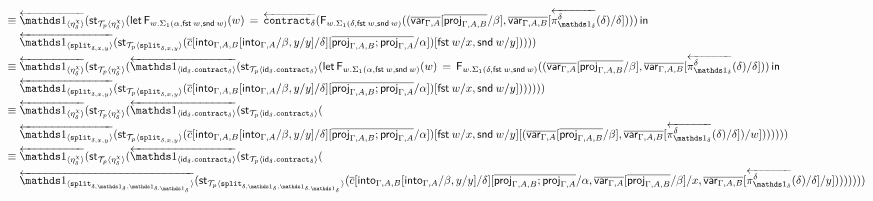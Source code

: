 \documentclass[10pt]{article}
\theoremstyle{definition}
\newcommand\dsd[1]{\ensuremath{\mathsf{#1}}}
\newcommand{\app}[2]{\ensuremath{#1 \: #2}}
\newcommand{\fst}[1]{\app{\dsd{fst}}{#1}}
\newcommand{\snd}[1]{\app{\dsd{snd}}{#1}}
\newcommand{\id}{\mathsf{id}}
\newcommand{\rewrite}[2]{\overleftarrow{#1}(#2)}
\newcommand\StI[2]{\ensuremath{\mathsf{st}_{#1}(#2)}}
\newcommand\FEs[4]{\ensuremath{\mathsf{let} \, \mathsf{F}_{#1}(#3) \, = \, {#2} \, \mathsf{in} \, #4}}
\newcommand\FIs[2]{\ensuremath{\mathsf{F}_{#1}{(#2)}}}
\newcommand\ApEl[2]{\mathcal{T}_{#1}\langle#2\rangle}
\newcommand\bdot[0]{\mathbin{.}}
\begin{document}
\begin{enumerate}[style = multiline, labelwidth = 80pt]
\begin{align*}
\equiv{} &\rewrite{\One_{\langle \eta^\chi_\delta \rangle}}{\StI{\ApEl{p}{\eta^\chi_\delta}}{\FEs{w. \Sigma_1(\alpha,\fst w, \snd w)}{\rewrite{\contract{\delta}}{\FIs{w. \Sigma_1(\delta,\fst w, \snd w)}{(\upstairs{\qvar{\Gamma, A}}[\upstairs{\proj{\Gamma, A, B}}/\beta], \upstairs{\qvar{\Gamma, A, B}}[\rewrite{\pi^\delta_{\One_\delta}}{\delta}/\delta])}}}{w}{\\&\rewrite{\ApOne{\tsplit{\delta,x,y}}}{\StI{\ApEl{p}{\tsplit{\delta,x,y}}}{\upstairs{c}[\into{\Gamma, A, B}[\into{\Gamma, A}/\beta, y/y] /\delta][\upstairs{\proj{\Gamma, A, B};\proj{\Gamma, A}}/\alpha]}[\fst w/x, \snd w/y]}})}} \\
\equiv{} &\rewrite{\One_{\langle \eta^\chi_\delta \rangle}}{\StI{\ApEl{p}{\eta^\chi_\delta}}{\rewrite{\One_{\langle \id_\delta \bdot \contract{\delta} \rangle}}{\StI{\ApEl{p}{\id_\delta \bdot \contract{\delta}}}{\FEs{w. \Sigma_1(\alpha,\fst w, \snd w)}{\FIs{w. \Sigma_1(\delta,\fst w, \snd w)}{(\upstairs{\qvar{\Gamma, A}}[\upstairs{\proj{\Gamma, A, B}}/\beta], \upstairs{\qvar{\Gamma, A, B}}[\rewrite{\pi^\delta_{\One_\delta}}{\delta}/\delta])}}{w}{\\&\rewrite{\ApOne{\tsplit{\delta,x,y}}}{\StI{\ApEl{p}{\tsplit{\delta,x,y}}}{\upstairs{c}[\into{\Gamma, A, B}[\into{\Gamma, A}/\beta, y/y] /\delta][\upstairs{\proj{\Gamma, A, B};\proj{\Gamma, A}}/\alpha]}[\fst w/x, \snd w/y]}})}}}} \\
\equiv{} &\rewrite{\One_{\langle \eta^\chi_\delta \rangle}}{\StI{\ApEl{p}{\eta^\chi_\delta}}{\rewrite{\One_{\langle \id_\delta \bdot \contract{\delta} \rangle}}{\StI{\ApEl{p}{\id_\delta \bdot \contract{\delta}}}{\\&\rewrite{\ApOne{\tsplit{\delta,x,y}}}{\StI{\ApEl{p}{\tsplit{\delta,x,y}}}{\upstairs{c}[\into{\Gamma, A, B}[\into{\Gamma, A}/\beta, y/y] /\delta][\upstairs{\proj{\Gamma, A, B};\proj{\Gamma, A}}/\alpha]}[\fst w/x, \snd w/y][(\upstairs{\qvar{\Gamma, A}}[\upstairs{\proj{\Gamma, A, B}}/\beta], \upstairs{\qvar{\Gamma, A, B}}[\rewrite{\pi^\delta_{\One_\delta}}{\delta}/\delta])/w]}})}}} \\
\equiv{} &\rewrite{\One_{\langle \eta^\chi_\delta \rangle}}{\StI{\ApEl{p}{\eta^\chi_\delta}}{\rewrite{\One_{\langle \id_\delta \bdot \contract{\delta} \rangle}}{\StI{\ApEl{p}{\id_\delta \bdot \contract{\delta}}}{\\&\rewrite{\ApOne{\tsplit{\delta,\One_\delta,\One_{\delta.\One_\delta}}}}{\StI{\ApEl{p}{\tsplit{\delta,\One_\delta,\One_{\delta.\One_\delta}}}}{\upstairs{c}[\into{\Gamma, A, B}[\into{\Gamma, A}/\beta, y/y] /\delta][\upstairs{\proj{\Gamma, A, B};\proj{\Gamma, A}}/\alpha, \upstairs{\qvar{\Gamma, A}}[\upstairs{\proj{\Gamma, A, B}}/\beta]/x, \upstairs{\qvar{\Gamma, A, B}}[\rewrite{\pi^\delta_{\One_\delta}}{\delta}/\delta]/y]}}})}}} \\

\end{align*}
\end{enumerate}
\end{document}
